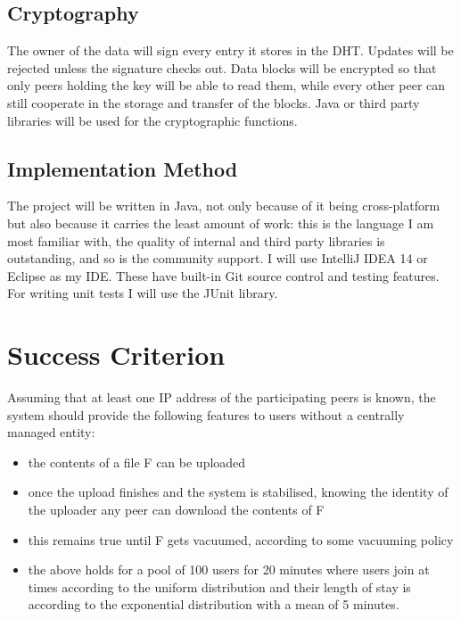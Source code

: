 \documentclass[12pt]{article}
\begin{document}
\subsection{Cryptography}

The owner of the data will sign every entry it stores in the DHT. Updates will be rejected unless the signature checks out. Data blocks will be encrypted so that only peers holding the key will be able to read them, while every other peer can still cooperate in the storage and transfer of the blocks. Java or third party libraries will be used for the cryptographic functions.

\subsection{Implementation Method}

The project will be written in Java, not only because of it being cross-platform but also because it carries the least amount of work: this is the language I am most familiar with, the quality of internal and third party libraries is outstanding, and so is the community support. I will use IntelliJ IDEA 14 or Eclipse as my IDE. These have built-in Git source control and testing features. For writing unit tests I will use the JUnit library.


\section{Success Criterion}

Assuming that at least one IP address of the participating peers is known, the system should provide the following features to users without a centrally managed entity:

\begin{itemize}
\item{the contents of a file F can be uploaded}
\item{once the upload finishes and the system is stabilised, knowing the identity of the uploader any peer can download the contents of F}
\item{this remains true until F gets vacuumed, according to some vacuuming policy}
\item{the above holds for a pool of 100 users for 20 minutes where users join at times according to the uniform distribution and their length of stay is according to the exponential distribution with a mean of 5 minutes.}
\end{itemize}
\end{document}
